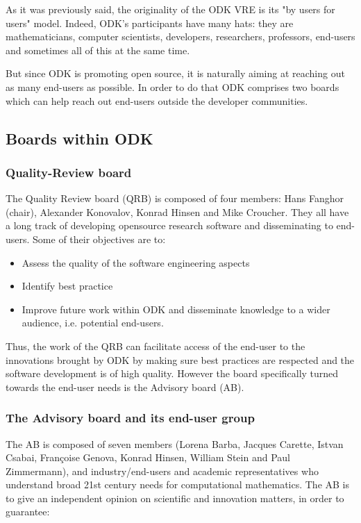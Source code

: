 \documentclass{deliverablereport}
\begin{document}

As it was previously said, the originality of the ODK VRE is its "by users for users" model. Indeed, ODK's participants have many hats: they are mathematicians, computer scientists, developers, researchers, professors, end-users and sometimes all of this at the same time.

But since ODK is promoting open source, it is naturally aiming at reaching out as many end-users as possible. In order to do that ODK comprises two boards which can help reach out end-users outside the developer communities.

\subsection{Boards within ODK}

\subsubsection{Quality-Review board}

The Quality Review board (QRB) is composed of four members: Hans
Fanghor (chair), Alexander Konovalov, Konrad Hinsen and Mike
Croucher. They all have a long track of developing opensource research
software and disseminating to end-users. Some of their objectives are
to:

\begin{itemize}
\item{Assess the quality of the software engineering aspects}
\item{Identify best practice}
\item{Improve future work within ODK and disseminate knowledge to a wider audience, i.e. potential end-users.}
\end{itemize}

Thus, the work of the QRB can facilitate access of the end-user to the
innovations brought by ODK by making sure best practices are
respected and the software development is of high quality. However the
board specifically turned towards the end-user needs is the Advisory
board (AB).

\subsubsection{The Advisory board and its end-user group}

The AB is composed of seven members (Lorena Barba, Jacques Carette,
Istvan Csabai, Françoise Genova, Konrad Hinsen, William Stein and Paul
Zimmermann), and industry/end-users and academic representatives who
understand broad 21st century needs for computational mathematics.
The AB is to give an independent opinion on scientific and innovation
matters, in order to guarantee:
\end{document}
